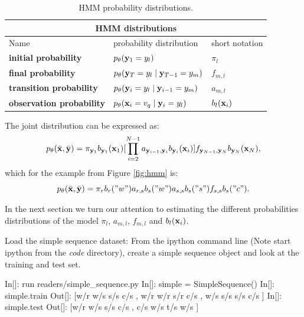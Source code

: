 \begin{table}[h]
\begin{center}
\begin{tabular}{|l|l|l|}
\hline
\multicolumn{3}{|c|}{HMM distributions}\\
\hline
Name & probability distribution & short notation \\
\hline
\textbf{initial probability} & $p_{\theta} (\mathbf{y}_1 = {y}_l)$ & $\pi_{l}$\\
\hline
\textbf{final probability} & $p_{\theta} (\mathbf{y}_T = {y}_l \mid
\mathbf{y}_{T-1} = {y}_m)$ & $f_{m,l}$\\
\hline
\textbf{transition probability} & $p_{\theta} (\mathbf{y}_i = {y}_l \mid
\mathbf{y}_{i-1} = {y}_m)$ & $a_{m,l}$\\
\hline
\textbf{observation probability} & $p_{\theta}(\mathbf{x}_i = {v}_q\mid \mathbf{y}_i = {y}_l)$ & $b_l(\mathbf{x}_i) $ \\
\hline
\end{tabular}
\end{center}
\caption[HMM probability distributions]{\label{tab:hmm-dist} HMM probability distributions.}
\end{table}

The joint distribution can be expressed as:
\begin{equation}
  p_{\theta}(\bar{\mathbf{x}} ,\bar{\mathbf{y}}) =\pi_{\mathbf{y}_1}b_{\mathbf{y}_1}(\mathbf{x}_1) [\prod_{i=2}^{N-1}
  a_{\mathbf{y}_{i-1},\mathbf{y}_{i}} b_{\mathbf{y}_{i}}(\mathbf{x}_i)] f_{\mathbf{y}_{N-1},\mathbf{y}_N}b_{\mathbf{y}_{N}}(\mathbf{x}_N),
  \label{eqn:hmm}
\end{equation}
which for the example from Figure \ref{fig:hmm} is:
\begin{equation}
  p_{\theta}(\bar{\mathbf{x}} ,\bar{\mathbf{y}}) =\pi_{r} b_r("w") a_{r,s}b_s("w") a_{s,s}b_s("s") f_{s,s}b_s("c").
  \label{eqn:hmm_ex}
\end{equation}

In the next section we turn our attention to estimating the different
probabilities distributions of the model  $\pi_l$, $a_{m,l}$,
$f_{m,l}$ and $b_l(\mathbf{x}_i)$.

\begin{exercise}
Load the simple sequence dataset:
From the ipython command line (Note start ipython from the \emph{code}
directory), create a simple sequence object and look at the training
and test set.
\begin{python}
 In[]: run readers/simple_sequence.py
 In[]: simple = SimpleSequence()
 In[]: simple.train
Out[]: [w/r w/s s/s c/s , w/r w/r s/r c/s , w/s s/s s/s c/s ]
 In[]: simple.test
Out[]: [w/r w/s s/s c/s , c/s w/s t/s w/s ] 
\end{python}
\end{exercise}
